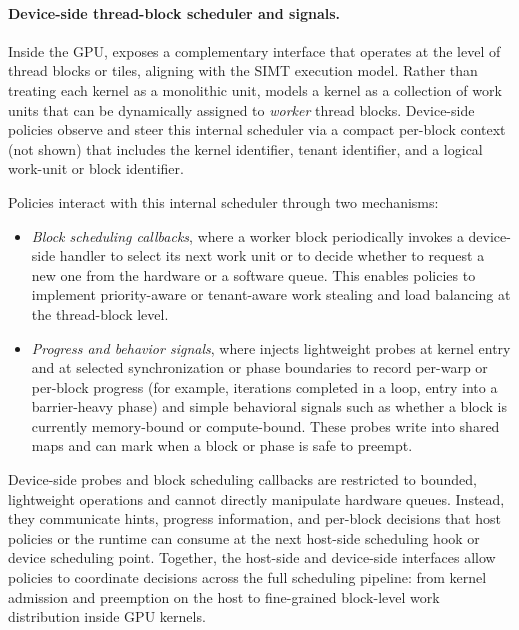 \paragraph{Device-side thread-block scheduler and signals.}
Inside the GPU, \sys exposes a complementary interface that operates at the level of
thread blocks or tiles, aligning with the SIMT execution model. Rather than treating
each kernel as a monolithic unit, \sys models a kernel as a collection of work units
that can be dynamically assigned to \emph{worker} thread blocks. Device-side policies
observe and steer this internal scheduler via a compact per-block context (not shown)
that includes the kernel identifier, tenant identifier, and a logical work-unit or
block identifier.

Policies interact with this internal scheduler through two mechanisms:

\begin{itemize}[leftmargin=*]
  \item \emph{Block scheduling callbacks}, where a worker block periodically invokes
        a device-side \sys handler to select its next work unit or to decide whether
        to request a new one from the hardware or a software queue. This enables
        policies to implement priority-aware or tenant-aware work stealing and
        load balancing at the thread-block level.
  \item \emph{Progress and behavior signals}, where \sys injects lightweight probes
        at kernel entry and at selected synchronization or phase boundaries to
        record per-warp or per-block progress (for example, iterations completed
        in a loop, entry into a barrier-heavy phase) and simple behavioral signals
        such as whether a block is currently memory-bound or compute-bound. These
        probes write into shared maps and can mark when a block or phase is safe
        to preempt.
\end{itemize}

Device-side probes and block scheduling callbacks are restricted to bounded,
lightweight operations and cannot directly manipulate hardware queues. Instead,
they communicate hints, progress information, and per-block decisions that host
policies or the \sys runtime can consume at the next host-side scheduling hook or
device scheduling point. Together, the host-side and device-side interfaces allow
\sys policies to coordinate decisions across the full scheduling pipeline: from
kernel admission and preemption on the host to fine-grained block-level work
distribution inside GPU kernels.
